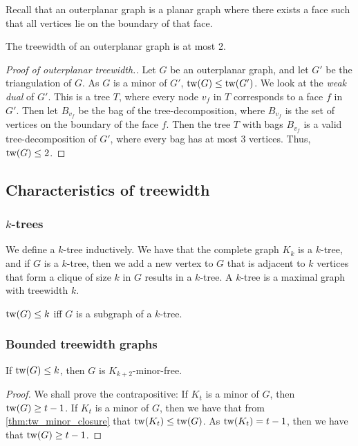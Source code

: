 Recall that an outerplanar graph is a planar graph where there exists a face such that all vertices lie on the boundary of that face. 
\begin{example}\label{ex:tw_outerplanar}
	The treewidth of an outerplanar graph is at most 2.
\end{example}
\begin{proof}[Proof of outerplanar treewidth.]
	Let $G$ be an outerplanar graph, and let $G'$ be the triangulation of $G$. As $G$ is a minor of $G'$, $\text{tw}(G) \leq \text{tw}(G')$. We look at the \textit{weak dual} of $G'$. This is a tree $T$, where every node $v_f$ in $T$ corresponds to a face $f$ in $G'$. Then let $B_{v_f}$ be the bag of the tree-decomposition, where $B_{v_f}$ is the set of vertices on the boundary of the face $f$. Then the tree $T$ with bags $B_{v_f}$ is a valid tree-decomposition of $G'$, where every bag has at most 3 vertices. Thus, $\text{tw}(G) \leq 2$. 
\end{proof}

\subsection{Characteristics of treewidth}\label{ssec:characterising_Treewidth}
\subsubsection{$k$-trees}\label{sssec:k-trees}
We define a $k$-tree inductively. We have that the complete graph $K_k$ is a $k$-tree, and if $G$ is a $k$-tree, then we add a new vertex to $G$ that is adjacent to $k$ vertices that form a clique of size $k$ in $G$ results in a $k$-tree. 
A $k$-tree is a maximal graph with treewidth $k$. 
\begin{theorem}
	$\text{tw}(G) \leq k$ iff $G$ is a subgraph of a $k$-tree. 
\end{theorem}


\subsubsection{Bounded treewidth graphs}\label{sssec:Graph_treewidth_Bounded}
\begin{theorem}\label{thm:treewidth_clique-minor-free}
	If $\text{tw}(G) \leq k$, then $G$ is $K_{k+2}$-minor-free. 
\end{theorem}
\begin{proof}
	We shall prove the contrapositive: If $K_t$ is a minor of $G$, then $\text{tw}(G) \geq t-1$.
	If $K_t$ is a minor of $G$, then we have that from \cref{thm:tw_minor_closure} that $\text{tw}(K_t) \leq \text{tw}(G)$. As $\text{tw}(K_t) = t-1$, then we have that $\text{tw}(G) \geq t - 1$. 
\end{proof}

